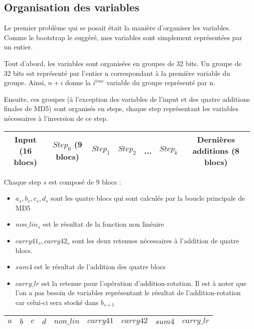 \documentclass{article}
\begin{document}
\subsection{Organisation des variables}
Le premier problème qui se posait était la manière d'organiser les variables. Comme le bootstrap le suggéré, mes variables sont simplement représentées par un entier. 
\par
Tout d'abord, les variables sont organisées en groupes de 32 bits. Un groupe de 32 bits est représenté par l'entier n correspondant à la première variable du groupe. Ainsi, $n + i$ donne la $i^{ème}$ variable du groupe représenté par n. 
\par
Ensuite, ces groupes (à l'exception des variables de l'input et des quatre additions finales de MD5) sont organisés en steps, chaque step représentant les variables nécessaires à l'inversion de ce step.
\newline

\begin{tabular}{|c|c|c|c|c|c|c|}
   \hline
   Input (16 blocs) & $Step_0$ (9 blocs) & $Step_1$ & $Step_2$ & ... & $Step_k$ & Dernières additions (8 blocs) \\
   \hline
\end{tabular}
\newline
\par
Chaque step $s$ est composé de 9 blocs : 
\begin{itemize}
\item $a_s,b_s,c_s,d_s$ sont les quatre blocs qui sont calculés par la boucle principale de MD5
\item $non\_lin_s$ est le résultat de la fonction non linéaire
\item $carry41_s, carry42_s$ sont les deux retenues nécessaires à l'addition de quatre blocs.
\item $sum4$ est le résultat de l'addition des quatre blocs
\item $carry\_lr$ est la retenue pour l'opération d'addition-rotation. Il est à noter que l'on a pas besoin de variables représentant le résultat de l'addition-rotation car celui-ci sera stocké dans $b_{s+1}$
\end{itemize}

\begin{tabular}{|c|c|c|c|c|c|c|c|c|}
   \hline
   $a$ & $b$ & $c$ & $d$ & $non\_lin$ & $carry41$ & $carry42$ & $sum4$ & $carry\_lr$ \\
   \hline
\end{tabular}
\end{document}
